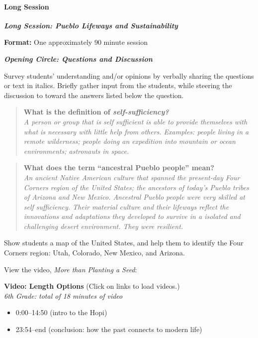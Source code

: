 \documentclass[12pt,]{article}
\providecommand{\tightlist}{%
  \setlength{\itemsep}{0pt}\setlength{\parskip}{0pt}}
\let\oldparagraph\paragraph
\renewcommand{\paragraph}[1]{\oldparagraph{#1}\mbox{}}
\begin{document}
\hypertarget{long-session}{%
\paragraph{Long Session}\label{long-session}}

\textbf{\emph{Long Session: Pueblo Lifeways and Sustainability}}

\textbf{Format:} One approximately 90 minute session

\textbf{\emph{Opening Circle: Questions and Discussion}}

Survey students' understanding and/or opinions by verbally sharing the
questions or text in italics. Briefly gather input from the students,
while steering the discussion to toward the answers listed below the
question.

\begin{quote}
\textbf{What is the definition of \emph{self-sufficiency?}}\\
\emph{A person or group that is self sufficient is able to provide
themselves with what is necessary with little help from others.
Examples: people living in a remote wilderness; people doing an
expedition into mountain or ocean environments; astronauts in space.}
\end{quote}

\begin{quote}
\textbf{What does the term ``ancestral Pueblo people'' mean?}\\
\emph{An ancient Native American culture that spanned the present-day Four
Corners region of the United States; the ancestors of today's Pueblo
tribes of Arizona and New Mexico. Ancestral Pueblo people were very
skilled at self sufficiency. Their material culture and their lifeways
reflect the innovations and adaptations they developed to survive in a
isolated and challenging desert environment. They were resilient.}
\end{quote}

Show students a map of the United States, and help them to identify the
Four Corners region: Utah, Colorado, New Mexico, and Arizona.

View the video, \emph{More than Planting a Seed}:

\textbf{Video: Length Options} (Click on links to load videos.)\\
\emph{6th Grade: total of 18 minutes of video}

\begin{itemize}
\tightlist
\item
  0:00--14:50 (intro to the Hopi)
\item
  23:54--end (conclusion: how the past connects to modern life)
\end{itemize}
\end{document}
